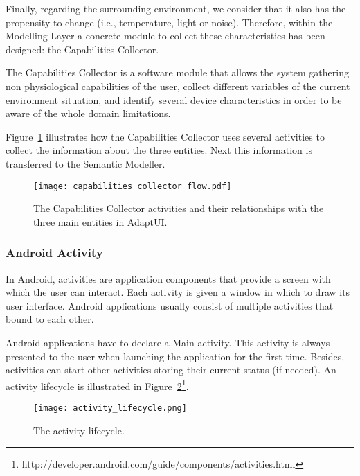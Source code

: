 Finally, regarding the surrounding environment, we consider that it also has the 
propensity to change (i.e., temperature, light or noise). Therefore, within the 
Modelling Layer a concrete module to collect these characteristics has been 
designed: the Capabilities Collector.

The Capabilities Collector is a software module that allows the system gathering 
non physiological capabilities of the user, collect different variables of the 
current environment situation, and identify several device characteristics in 
order to be aware of the whole domain limitations.

Figure~\ref{fig:capabilities_collector_flow} illustrates how the Capabilities 
Collector uses several activities to collect the information about the three 
entities. Next this information is transferred to the Semantic Modeller.

\begin{figure}
\centering
\texttt{[image: capabilities\_collector\_flow.pdf]}
\caption{The Capabilities Collector activities and their relationships with the
three main entities in AdaptUI.}
\label{fig:capabilities_collector_flow}
\end{figure}


\subsubsection{Android Activity}
\label{sec:activities}

In Android, activities are application components that provide a screen with
which the user can interact. Each activity is given a window in which to draw
its user interface. Android applications usually consist of multiple activities 
that bound to each other. 

Android applications have to declare a Main activity. This activity is always
presented to the user when launching the application for the first time. Besides,
activities can start other activities storing their current status (if needed).
An activity lifecycle is illustrated in Figure~\ref{fig:activity_lifecycle}\footnote{\label{activities}http://developer.android.com/guide/components/activities.html}.

\begin{figure}
\centering
\texttt{[image: activity\_lifecycle.png]}
\caption{The activity lifecycle.}
\label{fig:activity_lifecycle}
\end{figure}

